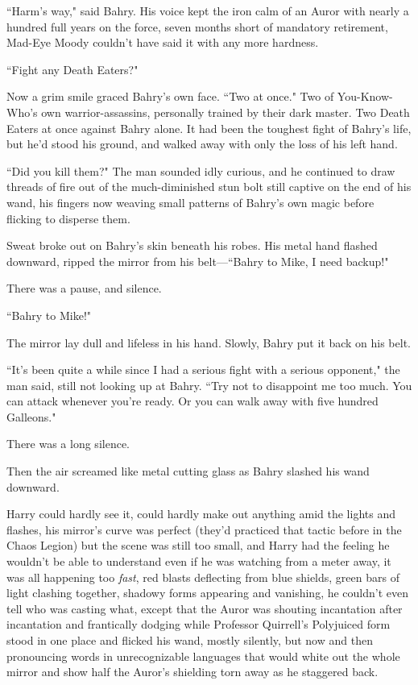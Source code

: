 ``Harm's way," said Bahry. His voice kept the iron calm of an Auror with nearly a hundred full years on the force, seven months short of mandatory retirement, Mad-Eye Moody couldn't have said it with any more hardness.

``Fight any Death Eaters?"

Now a grim smile graced Bahry's own face. ``Two at once." Two of You-Know-Who's own warrior-assassins, personally trained by their dark master. Two Death Eaters at once against Bahry alone. It had been the toughest fight of Bahry's life, but he'd stood his ground, and walked away with only the loss of his left hand.

``Did you kill them?" The man sounded idly curious, and he continued to draw threads of fire out of the much-diminished stun bolt still captive on the end of his wand, his fingers now weaving small patterns of Bahry's own magic before flicking to disperse them.

Sweat broke out on Bahry's skin beneath his robes. His metal hand flashed downward, ripped the mirror from his belt—``Bahry to Mike, I need backup!"

There was a pause, and silence.

``Bahry to Mike!"

The mirror lay dull and lifeless in his hand. Slowly, Bahry put it back on his belt.

``It's been quite a while since I had a serious fight with a serious opponent," the man said, still not looking up at Bahry. ``Try not to disappoint me too much. You can attack whenever you're ready. Or you can walk away with five hundred Galleons."

There was a long silence.

Then the air screamed like metal cutting glass as Bahry slashed his wand downward.

\later

Harry could hardly see it, could hardly make out anything amid the lights and flashes, his mirror's curve was perfect (they'd practiced that tactic before in the Chaos Legion) but the scene was still too small, and Harry had the feeling he wouldn't be able to understand even if he was watching from a meter away, it was all happening too \emph{fast}, red blasts deflecting from blue shields, green bars of light clashing together, shadowy forms appearing and vanishing, he couldn't even tell who was casting what, except that the Auror was shouting incantation after incantation and frantically dodging while Professor Quirrell's Polyjuiced form stood in one place and flicked his wand, mostly silently, but now and then pronouncing words in unrecognizable languages that would white out the whole mirror and show half the Auror's shielding torn away as he staggered back.

